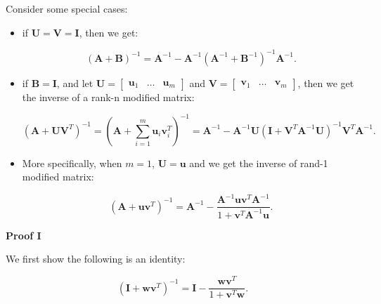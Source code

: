 \documentclass[10pt,b5paper,titlepage]{book}
\begin{document}
Consider some special cases:

\begin{itemize}
    \item if $\mathbf{U} = \mathbf{V} = \mathbf{I}$, then we get:

        \begin{equation}
            (\mathbf{A}+\mathbf{B})^{-1}
            = \mathbf{A}^{-1}
            - \mathbf{A}^{-1}(\mathbf{A}^{-1} + \mathbf{B}^{-1})^{-1} \mathbf{A}^{-1}
        .\end{equation}

    \item if $\mathbf{B} = \mathbf{I}$, and let
        $\mathbf{U} = \begin{bmatrix} \mathbf{u}_1 & \ldots & \mathbf{u}_m \end{bmatrix}$
        and $\mathbf{V} = \begin{bmatrix} \mathbf{v}_1 & \ldots & \mathbf{v}_m \end{bmatrix}$,
        then we get the inverse of a rank-n modified matrix:

        \begin{equation}
            (\mathbf{A} + \mathbf{U}\mathbf{V}^{T})^{-1}
            = \left( \mathbf{A}
            + \sum_{i=1}^{m} \mathbf{u}_{i}\mathbf{v}_{i}^{T} \right)^{-1}
            = \mathbf{A}^{-1} - \mathbf{A}^{-1}\mathbf{U}
            (\mathbf{I} + \mathbf{V}^{T}\mathbf{A}^{-1}\mathbf{U})^{-1}
            \mathbf{V}^{T}\mathbf{A}^{-1}
        .\end{equation}

    \item More specifically, when $m = 1$, $\mathbf{U} = \mathbf{u}$ and we
        get the inverse of rand-1 modified matrix:

        \begin{equation}
            (\mathbf{A} + \mathbf{u}\mathbf{v}^{T})^{-1}
            = \mathbf{A}^{-1}
            - \frac{\mathbf{A}^{-1}\mathbf{u}\mathbf{v}^{T}\mathbf{A}^{-1}}
            {1 + \mathbf{v}^{T}\mathbf{A}^{-1}\mathbf{u}}
        .\end{equation}
\end{itemize}

\textbf{Proof I}

We first show the following is an identity:

\begin{equation}
    (\mathbf{I} + \mathbf{w}\mathbf{v}^{T})^{-1}
    = \mathbf{I} - \frac{\mathbf{w}\mathbf{v}^{T}}{1 + \mathbf{v}^{T}\mathbf{w}}
.\end{equation}
\end{document}
